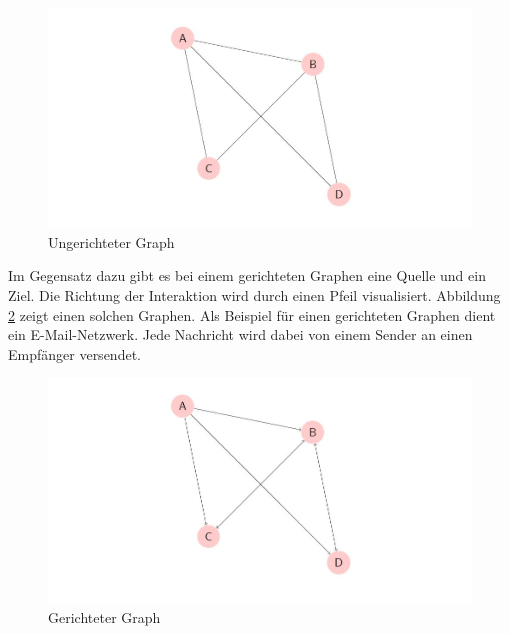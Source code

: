 \begin{figure}[h]
    \centering
    \includegraphics[scale=0.7]{resources/graph_undirected.JPG}
    \caption{Ungerichteter Graph}
    \label{fig:graph_undirected}
\end{figure}

Im Gegensatz dazu gibt es bei einem gerichteten Graphen eine Quelle und ein Ziel. Die Richtung der Interaktion wird durch einen Pfeil visualisiert.
Abbildung \ref{fig:graph_directed} zeigt einen solchen Graphen.
Als Beispiel für einen gerichteten Graphen dient ein E-Mail-Netzwerk. Jede Nachricht wird dabei von einem Sender an einen Empfänger versendet.

\begin{figure}[h]
    \centering
    \includegraphics[scale=0.7]{resources/graph_directed.JPG}
    \caption{Gerichteter Graph}
    \label{fig:graph_directed}
\end{figure}

